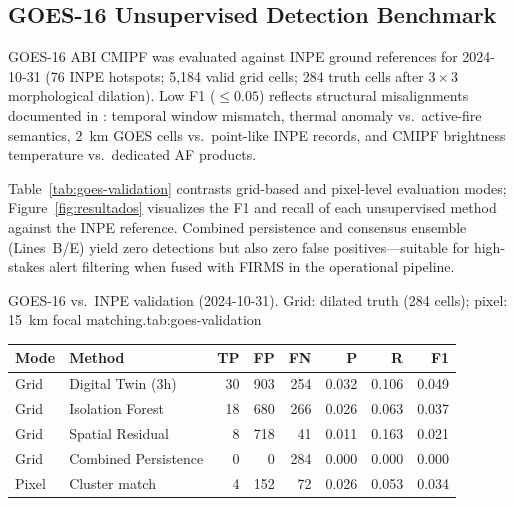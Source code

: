 
\subsection{GOES-16 Unsupervised Detection Benchmark}
\label{sec:goes16-validation}

GOES-16 ABI CMIPF was evaluated against INPE ground references for 2024-10-31 (76 INPE hotspots; 5{,}184 valid grid cells; 284 truth cells after $3\times3$ morphological dilation). Low F1 ($\leq 0.05$) reflects structural misalignments documented in : temporal window mismatch, thermal anomaly vs.\ active-fire semantics, 2~km GOES cells vs.\ point-like INPE records, and CMIPF brightness temperature vs.\ dedicated AF products.

Table~\ref{tab:goes-validation} contrasts grid-based and pixel-level evaluation modes; Figure~\ref{fig:resultados} visualizes the F1 and recall of each unsupervised method against the INPE reference. Combined persistence and consensus ensemble (Lines~B/E) yield zero detections but also zero false positives---suitable for high-stakes alert filtering when fused with FIRMS in the operational pipeline.


\begin{resulttable}{GOES-16 vs.\ INPE validation (2024-10-31). Grid: dilated truth (284 cells); pixel: 15~km focal matching.}{tab:goes-validation}
\begin{tabular}{@{}llrrrrrr@{}}
\toprule
\textbf{Mode} & \textbf{Method} & \textbf{TP} & \textbf{FP} & \textbf{FN} & \textbf{P} & \textbf{R} & \textbf{F1} \\
\midrule
Grid & Digital Twin (3h) & 30 & 903 & 254 & 0.032 & 0.106 & 0.049 \\
Grid & Isolation Forest & 18 & 680 & 266 & 0.026 & 0.063 & 0.037 \\
Grid & Spatial Residual & 8 & 718 & 41 & 0.011 & 0.163 & 0.021 \\
Grid & Combined Persistence & 0 & 0 & 284 & 0.000 & 0.000 & 0.000 \\
Pixel & Cluster match & 4 & 152 & 72 & 0.026 & 0.053 & 0.034 \\
\bottomrule
\end{tabular}
\end{resulttable}

